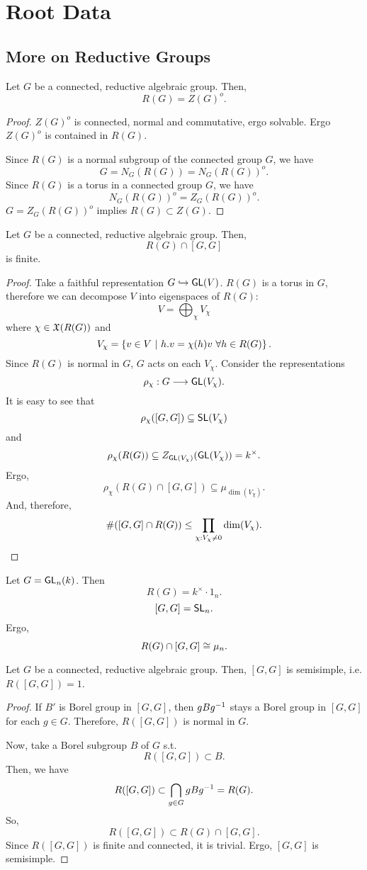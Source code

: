 \section{Root Data}
\subsection{More on Reductive Groups}

\begin{proposition}
Let $G$ be a connected, reductive algebraic group. Then,
\[ R(G) = Z(G)^o. \]	
\end{proposition}
\begin{proof}
	$Z(G)^o$ is connected, normal and commutative, ergo solvable. Ergo $Z(G)^o$ is contained in $R(G)$.
	
	Since $R(G)$ is a normal subgroup of the connected group $G$, we have
	\[  G = N_G(R(G)) =N_G(R(G))^o. \]
	Since $R(G)$ is a torus in a connected group $G$, we have
	\[ N_G(R(G))^o = Z_G(R(G))^o. \]
	$G = Z_G(R(G))^o$ implies $R(G) \subset Z(G)$.
\end{proof}

\begin{proposition}
	Let $G$ be a connected, reductive algebraic group. Then,
	\[ R(G) \cap [G,G] \]
	is finite.	
\end{proposition}
\begin{proof}
	Take a faithful representation $G \overset{}{\hookrightarrow} \textsf{GL}(V)$. $R(G)$ is a torus in $G$, therefore we can decompose $V$ into eigenspaces of $R(G)$:
	\[ V= \bigoplus_{\chi} V_\chi \]
	where $\chi \in \mathfrak{X}(R(G))$ and
	\[ V_\chi = \left\lbrace v \in V ~ | ~ h.v = \chi(h) v ~\forall h \in R(G)\right\rbrace. \]
	Since $R(G)$ is normal in $G$, $G$ acts on each $V_\chi$. Consider the representations
	\[ \rho_\chi : G \overset{}{\longrightarrow} \textsf{GL}(V_\chi). \]
	It is easy to see that
	\[ \rho_\chi ([G,G]) \subseteq \textsf{SL}(V_\chi) \]
	and
	\[ \rho_\chi(R(G)) \subseteq Z_{\textsf{GL}(V_\chi)}(\textsf{GL}(V_\chi)) = k^\times. \]
	Ergo,
	\[ \rho_\chi(R(G)\cap [G,G]) \subseteq \mu_{\dim(V_\chi)}. \]
	And, therefore,
	\[ \# ([G,G] \cap R(G)) \leq \prod_{\chi : V_\chi \neq 0} \dim(V_\chi). \qedhere \]
\end{proof}

\begin{example}
	Let $G = \textsf{GL}_n(k)$. Then
	\[ R(G) = k^\times \cdot 1_n. \]
	\[ [G,G] = \textsf{SL}_n. \]
	Ergo,
	\[ R(G) \cap [G,G] \overset{}{\cong} \mu_n. \]
\end{example}

\begin{proposition}
		Let $G$ be a connected, reductive algebraic group. 
		Then, $ [G,G] $ is semisimple, i.e. $R([G,G]) = 1$.
\end{proposition}
\begin{proof}
If $B'$ is Borel group in $[G,G]$, then $gBg^{-1}$ stays a Borel group in $[G,G]$ for each $g \in G$. Therefore, $R([G,G])$ is normal in $G$.

	Now, take a Borel subgroup $B$ of $G$ s.t.
	\[ R([G,G]) \subset B. \]
Then, we have
\[ R([G,G]) \subset \bigcap_{g\in G}gBg^{-1} = R(G). \]
So,
\[ R([G,G]) \subset R(G) \cap [G,G]. \]
Since $R([G,G])$ is finite and connected, it is trivial. Ergo, $[G,G]$ is semisimple.
\end{proof}

